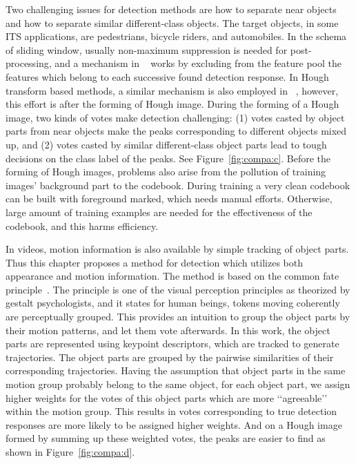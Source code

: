 Two challenging issues for detection methods are how to separate near objects and how to separate similar different-class objects. The target objects, in some ITS applications, are pedestrians, bicycle riders, and automobiles. In the schema of sliding window, usually non-maximum suppression is needed for post-processing, and a mechanism in ~\citep{ac4} works by excluding from the feature pool the features which belong to each successive found detection response. In Hough transform based methods, a similar mechanism is also employed in ~\citep{ac9}, however, this effort is after the forming of Hough image. During the forming of a Hough image, two kinds of votes make detection challenging: (1) votes casted by object parts from near objects make the peaks corresponding to different objects mixed up, and (2) votes casted by similar different-class object parts lead to tough decisions on the class label of the peaks. See Figure~\ref{fig:compa:c}. Before the forming of Hough images, problems also arise from the pollution of training images' background part to the codebook. During training a very clean codebook can be built with foreground marked, which needs manual efforts. Otherwise, large amount of training examples are needed for the effectiveness of the codebook, and this harms efficiency.


In videos, motion information is also available by simple tracking of object parts. Thus this chapter proposes a method for detection which utilizes both appearance and motion information. The method is based on the common fate principle~\citep{ac13}. The principle is one of the visual perception principles as theorized by gestalt psychologists, and it states for human beings, tokens moving coherently are perceptually grouped. This provides an intuition to group the object parts by their motion patterns, and let them vote afterwards. In this work, the object parts are represented using keypoint descriptors, which are tracked to generate trajectories. The object parts are grouped by the pairwise similarities of their corresponding trajectories. Having the assumption that object parts in the same motion group  probably belong to the same object, for each object part, we assign higher weights for the votes of this object parts which are more {\lq\lq}agreeable{\rq\rq} within the motion group. This results in votes corresponding to true detection responses are more likely to be assigned higher weights. And on a Hough image formed by summing up these weighted votes, the peaks are easier to find as shown in Figure~\ref{fig:compa:d}.




